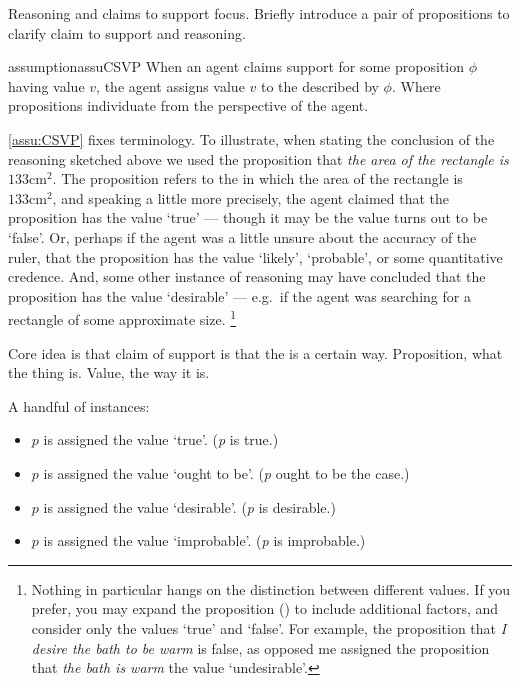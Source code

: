 \begin{note}
  Reasoning and claims to support focus.
  Briefly introduce a pair of propositions to clarify claim to support and reasoning.

  \begin{restatable}{assumption}{assuCSVP}
    \label{assu:CSVP}
    When an agent claims support for some proposition \(\phi\) having value \(v\), the agent assigns value \(v\) to the \world{} described by \(\phi\).
    Where propositions individuate  from the perspective of the agent.
  \end{restatable}

  \autoref{assu:CSVP} fixes terminology.
  To illustrate, when stating the conclusion of the reasoning sketched above we used the proposition that \emph{the area of the rectangle is \(133\text{cm}^{2}\)}.
  The proposition refers to the \world{} in which the area of the rectangle is \(133\text{cm}^{2}\), and speaking a little more precisely, the agent claimed that the proposition has the value `true' --- though it may be the value turns out to be `false'.
  Or, perhaps if the agent was a little unsure about the accuracy of the ruler, that the proposition has the value `likely', `probable', or some quantitative credence.
  And, some other instance of reasoning may have concluded that the proposition has the value `desirable' --- e.g.\ if the agent was searching for a rectangle of some approximate size.\nolinebreak
  \footnote{
    Nothing in particular hangs on the distinction between different values.
    If you prefer, you may expand the proposition (\world{}) to include additional factors, and consider only the values `true' and `false'.
    For example, the proposition that \emph{I desire the bath to be warm} is false, as opposed me assigned the proposition that \emph{the bath is warm} the value `undesirable'.
  }
\end{note}

\begin{note}
  Core idea is that claim of support is that the \world{} is a certain way.
  Proposition, what the thing is.
  Value, the way it is.

  A handful of instances:
  \begin{itemize}
  \item \(p\) is assigned the value `true'. \hfill (\emph{p} is true.)
  \item \(p\) is assigned the value `ought to be'. \hfill (\emph{p} ought to be the case.)
  \item \(p\) is assigned the value `desirable'. \hfill (\emph{p} is desirable.)
  \item \(p\) is assigned the value `improbable'. \hfill (\emph{p} is improbable.)
  \end{itemize}
\end{note}

